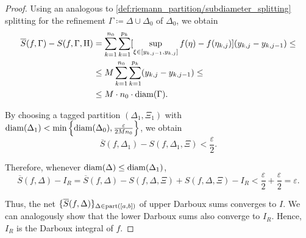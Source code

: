 \begin{proof}
  Using an analogous to \eqref{def:riemann_partition/subdiameter_splitting} splitting for the refinement \( \Gamma \coloneqq \Delta \cup \Delta_0 \) of \( \Delta_0 \), we obtain
  \begin{align*}
    \overline{S}(f, \Gamma) - S(f, \Gamma, \operatorname{H})
    &=
    \sum_{k=1}^{n_0} \sum_{k=1}^{p_k} [ \sup_{\xi \in [y_{k,j-1}, y_{k,j}]} f(\eta) - f(\eta_{k,j}) ] (y_{k,j} - y_{k,j-1})
    \leq \\ &\leq
    M \sum_{k=1}^{n_0} \sum_{k=1}^{p_k} (y_{k,j} - y_{k,j-1})
    \leq \\ &\leq
    M \cdot n_0 \cdot \operatorname{diam}(\Gamma).
  \end{align*}

  By choosing a tagged partition \( (\Delta_1, \Xi_1) \) with \( \operatorname{diam}(\Delta_1) < \min \left\{ \operatorname{diam}(\Delta_0), \frac \varepsilon {2 M n_0} \right\} \), we obtain
  \begin{equation*}
    \overline{S}(f, \Delta_1) - S(f, \Delta_1, \Xi) < \frac \varepsilon 2.
  \end{equation*}

  Therefore, whenever \( \operatorname{diam}(\Delta) \leq \operatorname{diam}(\Delta_1) \),
  \begin{equation*}
    \overline{S}(f, \Delta) - I_R
    =
    \overline{S}(f, \Delta) - S(f, \Delta, \Xi) + S(f, \Delta, \Xi) - I_R
    <
    \frac \varepsilon 2 + \frac \varepsilon 2
    =
    \varepsilon.
  \end{equation*}

  Thus, the net \( \{ \overline{S}(f, \Delta) \}_{\Delta \in \operatorname{part}([a, b])} \) of upper Darboux sums converges to \( I \). We can analogously show that the lower Darboux sums also converge to \( I_R \). Hence, \( I_R \) is the Darboux integral of \( f \).
\end{proof}

